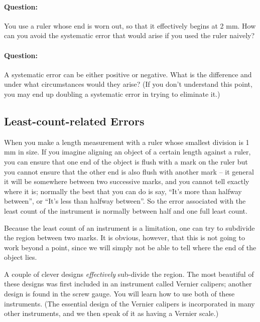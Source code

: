 \begin{question}
\paragraph{Question:} You use a ruler whose end is worn out, so that it effectively begins at 2 mm. How can you avoid the systematic error that would arise if you used the ruler naively?


\paragraph{Question:} A systematic error can be either positive or negative. What is the difference and under what circumstances would they arise? (If you don't understand this point, you may end up doubling a systematic error in trying to eliminate it.)
\end{question}

\subsection{Least-count-related Errors}

When you make a length measurement with a ruler whose smallest division is 1 mm in size. If you imagine aligning an object of a certain length against a ruler, you can ensure that one end of the object is flush with a mark on the ruler but you cannot ensure that the other end is also flush with another mark -- it general it will be somewhere between two successive marks, and you cannot tell exactly where it is; normally the best that you can do is say, ``It's more than halfway between'', or ``It's less than halfway between''. So the error associated with the least count of the instrument is normally between half and one full least count. 

Because the least count of an instrument is a limitation, one can try to subdivide the region between two marks. It is obvious, however, that this is not going to work beyond a point, since we will simply not be able to tell where the end of the object lies. 

A couple of clever designs \textit{effectively} sub-divide the region. The most beautiful of these designs was first included in an instrument called Vernier calipers; another design is found in the screw gauge. You will learn how to use both of these instruments. (The essential design of the Vernier calipers is incorporated in many other instruments, and we then speak of it as having a Vernier scale.)

